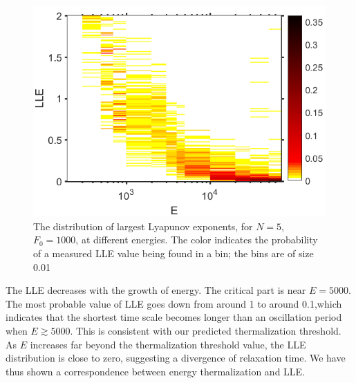 \documentclass[onecolumn,pra]{revtex4-1}
\begin{document}
\begin{figure}[tbph]
\centering
\includegraphics[scale=0.4]{ZhiyuPictures/LLEdistribution_1_11_pre_hot2_screenshot.png}
\caption{The distribution of largest Lyapunov exponents, for $N=5$, $F_0=1000$, at different
  energies.  The color indicates the probability of a measured LLE value being found in a bin; the
  bins are of size 0.01}\label{fig:LLEdistribution1}
\end{figure}




The LLE decreases with the growth of energy. The critical part is near $E=5000$. The most probable
value of LLE goes down from around 1 to around 0.1,which indicates that the shortest time scale
becomes longer than an oscillation period when $E\gtrsim5000$.  This is consistent with our
predicted thermalization threshold.  As $E$ increases far beyond the thermalization threshold value,
the LLE distribution is close to zero, suggesting a divergence of relaxation time.
%
We have thus shown a correspondence between energy thermalization and LLE.
\end{document}
